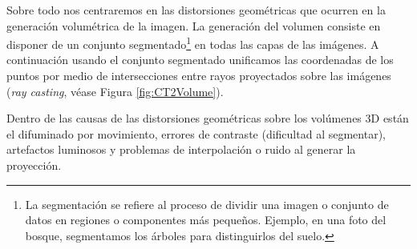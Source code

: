 Sobre todo nos centraremos en las distorsiones geométricas que ocurren en la 
generación volumétrica de la imagen. La generación del volumen consiste en 
disponer de un conjunto segmentado\footnote{
La segmentación se refiere al proceso de dividir una imagen o conjunto de datos en regiones o componentes más pequeños. 
Ejemplo, en una foto del bosque, segmentamos los árboles para distinguirlos del suelo.
} en todas las capas de las imágenes. A continuación usando el conjunto segmentado 
unificamos las coordenadas de los puntos por medio de intersecciones entre rayos 
proyectados sobre las imágenes (\emph{ray casting}, véase Figura \ref{fig:CT2Volume}).


Dentro de las causas de las distorsiones geométricas sobre los volúmenes 
3D están el difuminado por movimiento, errores de contraste (dificultad al segmentar),
artefactos luminosos y problemas de interpolación o ruido al generar la proyección. 


